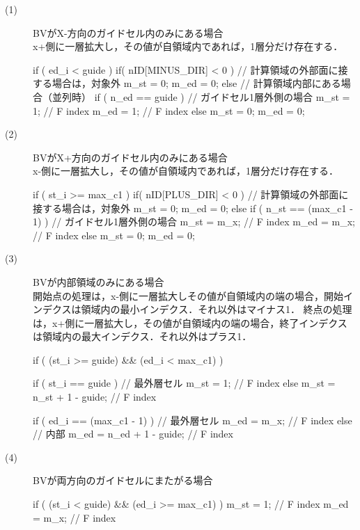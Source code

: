 \begin{description}
\item[(1)] BVがX-方向のガイドセル内のみにある場合\\
x+側に一層拡大し，その値が自領域内であれば，1層分だけ存在する．
{\small
\begin{program}
if ( ed_i < guide ) { 
  if( nID[MINUS_DIR] < 0 ){ // 計算領域の外部面に接する場合は，対象外
    m_st = 0;
    m_ed = 0;
  }
  else { // 計算領域内部にある場合（並列時）
    if ( n_ed == guide ) { // ガイドセル1層外側の場合
      m_st = 1; // F index
      m_ed = 1; // F index
    }
    else {
      m_st = 0;
      m_ed = 0;
    }
  }
}
\end{program}
}

\item[(2)] BVがX+方向のガイドセル内のみにある場合\\
x-側に一層拡大し，その値が自領域内であれば，1層分だけ存在する．
{\small
\begin{program}
if ( st_i >= max_c1 ) {
  if( nID[PLUS_DIR] < 0 ){ // 計算領域の外部面に接する場合は，対象外
    m_st = 0;
    m_ed = 0;
  }
  else {
    if ( n_st == (max_c1 - 1) ) { // ガイドセル1層外側の場合
      m_st = m_x; // F index
      m_ed = m_x; // F index
    }
    else {
      m_st = 0;
      m_ed = 0;
    }
  }
}
\end{program}
}

\item[(3)] BVが内部領域のみにある場合\\
開始点の処理は，x-側に一層拡大しその値が自領域内の端の場合，開始インデクスは領域内の最小インデクス．それ以外はマイナス1．
終点の処理は，x+側に一層拡大し，その値が自領域内の端の場合，終了インデクスは領域内の最大インデクス．それ以外はプラス1．
{\small
\begin{program}
if ( (st_i >= guide) && (ed_i < max_c1) ) {
  if ( st_i == guide ) { // 最外層セル
    m_st = 1; // F index
  }
  else {
    m_st = n_st + 1 - guide; // F index
  }
    
  if ( ed_i == (max_c1 - 1) ) { // 最外層セル
    m_ed = m_x; // F index
  }
  else { // 内部
    m_ed = n_ed + 1 - guide; // F index
  }
}
\end{program}
}

\item[(4)] BVが両方向のガイドセルにまたがる場合\\

{\small
\begin{program}
if ( (st_i < guide) && (ed_i >= max_c1) ) {
  m_st = 1; // F index
  m_ed = m_x; // F index
}
\end{program}
}


\end{description}
